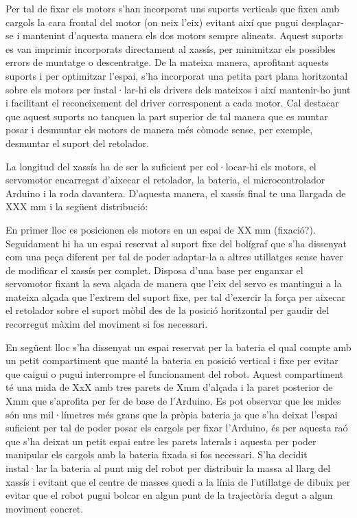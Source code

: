 Per tal de fixar els motors s’han incorporat uns suports verticals que fixen amb cargols la cara frontal del motor (on neix l’eix) evitant així que pugui desplaçar-se i mantenint d’aquesta manera els dos motors sempre alineats. Aquest suports es van imprimir incorporats directament al xassís, per minimitzar els possibles errors de muntatge o descentratge. De la mateixa manera, aprofitant aquests suports i per optimitzar l’espai, s’ha incorporat una petita part plana horitzontal sobre els motors per instal·lar-hi els drivers dels mateixos i així mantenir-ho junt i facilitant el reconeixement del driver corresponent a cada motor. Cal destacar que aquest suports no tanquen la part superior de tal manera que es muntar posar i desmuntar els motors de manera més còmode sense, per exemple, desmuntar el suport del retolador. 

La longitud del xassís ha de ser la suficient per col·locar-hi els motors, el servomotor encarregat d’aixecar el retolador, la bateria, el microcontrolador Arduino i la roda davantera. D’aquesta manera, el xassís final te una llargada de XXX mm i la següent distribució: 

En primer lloc es posicionen els motors en un espai de XX mm  (fixació?). Seguidament hi ha un espai reservat al suport fixe del bolígraf que s’ha dissenyat com una peça diferent per tal de poder adaptar-la a altres utillatges sense haver de modificar el xassís per complet. Disposa d’una base per enganxar el servomotor fixant la seva alçada de manera que l’eix del servo es mantingui a la mateixa alçada que l’extrem del suport fixe, per tal d’exercir la força per aixecar el retolador sobre el suport mòbil des de la posició horitzontal per gaudir del recorregut màxim del moviment si fos necessari. 

En següent lloc s’ha dissenyat un espai reservat per la bateria el qual compte amb un petit compartiment que manté la bateria en posició vertical i fixe per evitar que caigui o pugui interrompre el funcionament del robot. Aquest compartiment té una mida de XxX amb tres parets de Xmm d’alçada i la paret posterior de Xmm que s’aprofita per fer de base de l’Arduino. Es pot observar que les mides són uns mil·límetres més grans que la pròpia bateria ja que s’ha deixat l’espai suficient per tal de poder posar els cargols per fixar l’Arduino, és per aquesta raó que s’ha deixat un petit espai entre les parets laterals i aquesta per poder manipular els cargols amb la bateria fixada si fos necessari. S’ha decidit instal·lar la bateria al punt mig del robot per distribuir la massa al llarg del xassís i evitant que el centre de masses quedi a la línia de l’utillatge de dibuix per evitar que el robot pugui bolcar en algun punt de la trajectòria degut a algun moviment concret.   

